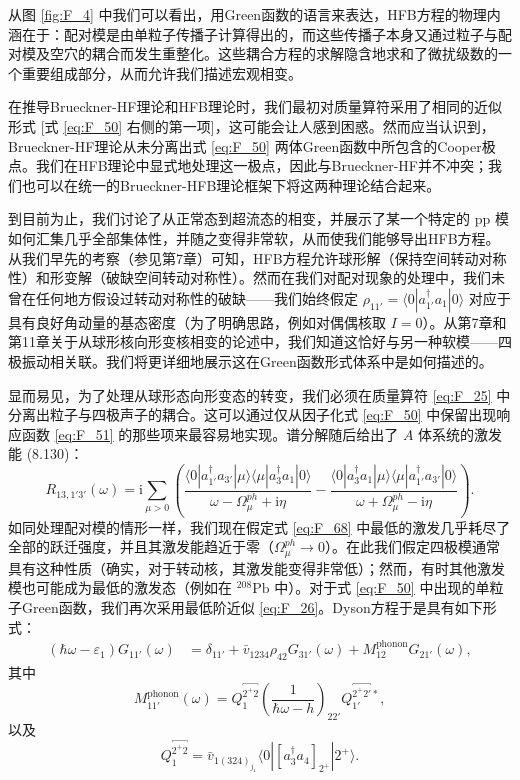 从图 \ref{fig:F_4} 中我们可以看出，用Green函数的语言来表达，HFB方程的物理内涵在于：配对模是由单粒子传播子计算得出的，而这些传播子本身又通过粒子与配对模及空穴的耦合而发生重整化。这些耦合方程的求解隐含地求和了微扰级数的一个重要组成部分，从而允许我们描述宏观相变。

在推导Brueckner-HF理论和HFB理论时，我们最初对质量算符采用了相同的近似形式 {[}式 \ref{eq:F_50} 右侧的第一项{]}，这可能会让人感到困惑。然而应当认识到，Brueckner-HF理论从未分离出式
\ref{eq:F_50} 两体Green函数中所包含的Cooper极点。我们在HFB理论中显式地处理这一极点，因此与Brueckner-HF并不冲突；我们也可以在统一的Brueckner-HFB理论框架下将这两种理论结合起来。

到目前为止，我们讨论了从正常态到超流态的相变，并展示了某一个特定的 pp 模如何汇集几乎全部集体性，并随之变得非常软，从而使我们能够导出HFB方程。从我们早先的考察（参见第7章）可知，HFB方程允许球形解（保持空间转动对称性）和形变解（破缺空间转动对称性）。然而在我们对配对现象的处理中，我们未曾在任何地方假设过转动对称性的破缺——我们始终假定
$\rho_{11'}=\langle0|a^{\dagger}_{1'}a_{1}|0\rangle$ 对应于具有良好角动量的基态密度（为了明确思路，例如对偶偶核取
$I=0$）。从第7章和第11章关于从球形核向形变核相变的论述中，我们知道这恰好与另一种软模——四极振动相关联。我们将更详细地展示这在Green函数形式体系中是如何描述的。

显而易见，为了处理从球形态向形变态的转变，我们必须在质量算符 \ref{eq:F_25} 中分离出粒子与四极声子的耦合。这可以通过仅从因子化式
\ref{eq:F_50} 中保留出现响应函数 \ref{eq:F_51} 的那些项来最容易地实现。谱分解随后给出了 $A$
体系统的激发能 (8.130)：
\begin{equation}
R_{13,1'3'}(\omega)=\mathrm{i}\sum_{\mu>0}\left(\frac{\langle0|a^{\dagger}_{1'}a_{3'}|\mu\rangle\langle\mu|a^{\dagger}_{3}a_{1}|0\rangle}{\omega-\Omega^{ph}_{\mu}+\mathrm{i}\eta}-\frac{\langle0|a^{\dagger}_{3}a_{1}|\mu\rangle\langle\mu|a^{\dagger}_{1'}a_{3'}|0\rangle}{\omega+\Omega^{ph}_{\mu}-\mathrm{i}\eta}\right).\label{eq:F_68}
\end{equation}
如同处理配对模的情形一样，我们现在假定式 \ref{eq:F_68} 中最低的激发几乎耗尽了全部的跃迁强度，并且其激发能趋近于零（$\Omega^{ph}_{\mu}\rightarrow0$）。在此我们假定四极模通常具有这种性质（确实，对于转动核，其激发能变得非常低）；然而，有时其他激发模也可能成为最低的激发态（例如在
$^{208}\text{Pb}$ 中）。对于式 \ref{eq:F_50} 中出现的单粒子Green函数，我们再次采用最低阶近似
\ref{eq:F_26}。Dyson方程于是具有如下形式：
\begin{align}
(\hbar\omega-\varepsilon_{1})G_{11'}(\omega) & =\delta_{11'}+\bar{v}_{1234}\rho_{42}G_{31'}(\omega)+M^{\text{phonon}}_{12}G_{21'}(\omega),\label{eq:F_69}
\end{align}
其中
\begin{equation}
M^{\text{phonon}}_{11'}(\omega)=Q^{\overbracket{2^{+}2}}_{1}\left(\frac{1}{\hbar\omega-h}\right)_{22'}Q^{\overbracket{2^{+}2'}*}_{1'},\label{eq:F_70}
\end{equation}
以及
\begin{equation}
Q^{\overbracket{2^{+}2}}_{1}=\bar{v}_{1(324)_{j_{1}}}\langle0|[a^{\dagger}_{3}a_{4}]_{2^{+}}|2^{+}\rangle.\label{eq:F_71}
\end{equation}

